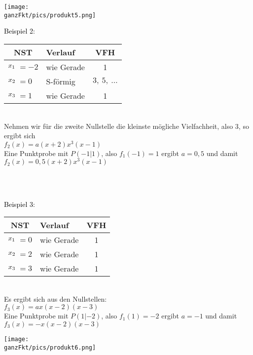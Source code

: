 \begin{minipage}{\linewidth}
	\begin{minipage}{0.5\linewidth}
		\texttt{[image: \\ganzFkt/pics/produkt5.png]}
	\end{minipage}
	{\color{loes}\begin{minipage}{0.5\linewidth}
			\textcolor{black}{Beispiel 2:}\\
			\begin{tabular}{rllc}
				\multicolumn{2}{c}{NST}&Verlauf&VFH\\
				\midrule
				\(x_1\hspace{-0.3cm}\)&\(=-2\)&wie Gerade&1\\
				\(x_2\hspace{-0.3cm}\)&\(=0\)&S-förmig&\(3,\ 5,\ \dots\)\\
				\(x_3\hspace{-0.3cm}\)&\(=1\)&wie Gerade&1
			\end{tabular}\\
			Nehmen wir für die zweite Nullstelle die kleinste mögliche Vielfachheit, also 3, so ergibt sich\\
			\(f_2(x)=a\left(x+2\right)x^3 \left(x-1\right) \)\\
			Eine Punktprobe mit \(P(-1|1)\), also \(f_1(-1)=1\) ergibt \(a=0,5\) und damit\\
			\(f_2(x)=0,5\left(x+2\right)x^3 \left(x-1\right) \)
	\end{minipage}}
\end{minipage}\\ \vspace{.15cm}\\
\begin{minipage}{\linewidth}
	{\color{loes}\begin{minipage}{0.5\linewidth}
			\textcolor{black}{Beispiel 3:}\\
			\begin{tabular}{rllc}
				\multicolumn{2}{c}{NST}&Verlauf&VFH\\
				\midrule
				\(x_1\hspace{-0.3cm}\)&\(=0\)&wie Gerade&1\\
				\(x_2\hspace{-0.3cm}\)&\(=2\)&wie Gerade&1\\
				\(x_3\hspace{-0.3cm}\)&\(=3\)&wie Gerade&1
			\end{tabular}\\
			Es ergibt sich aus den Nullstellen:\\
			\(f_3(x)=ax \left(x-2\right) \left(x-3\right) \)\\
			Eine Punktprobe mit \(P(1|-2)\), also \(f_1(1)=-2\) ergibt \(a=-1\) und damit\\
			\(f_3(x)=-x \left(x-2\right) \left(x-3\right) \)
	\end{minipage}}
	\begin{minipage}{0.5\linewidth}
		\texttt{[image: \\ganzFkt/pics/produkt6.png]}
	\end{minipage}
\end{minipage}
